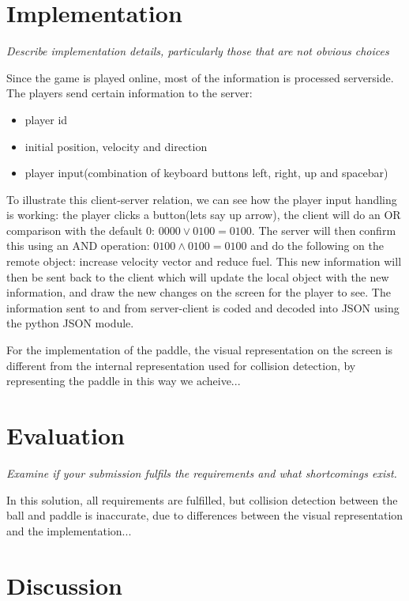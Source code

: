 \documentclass[11pt]{article}
\begin{document}
    \section{Implementation}

    \emph{Describe implementation details, particularly those that are not obvious choices}

    Since the game is played online, most of the information is processed
    serverside. The players send certain information to the server:
    \begin{itemize}
        \item player id
        \item initial position, velocity and direction
        \item player input(combination of keyboard buttons left, right, up and
        spacebar)
    \end{itemize}

    To illustrate this client-server relation, we can see how the player input
    handling is working: the player clicks a button(lets say up arrow), the client
    will do an OR comparison with the default 0: $0000 \lor 0100 = 0100$.
    The server will then confirm this using an AND operation: $0100 \land
    0100 = 0100$
    and do the following on the remote object: increase velocity vector and reduce
    fuel.
    This new information will then be sent back to the client which will
    update the local object with the new information, and draw the new changes on
    the screen for the player to see.
    The information sent to and from server-client is coded and decoded into
    JSON using the python JSON module.


    For the implementation of the paddle, the visual representation on the screen is different from the internal representation used for collision detection, by representing the paddle in this way we acheive...


    \section{Evaluation}

    \emph{Examine if your submission fulfils the requirements and what shortcomings exist.}

    In this solution, all requirements are fulfilled, but collision detection between the ball and paddle is inaccurate, due to differences between the visual representation and the implementation...


    \section{Discussion}
\end{document}
